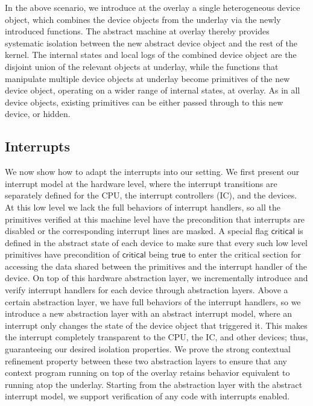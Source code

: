 In the above scenario, we introduce at the overlay a single heterogeneous device
object, which combines the device objects from the underlay via the newly
introduced functions. The abstract machine at overlay thereby provides
systematic isolation between the new abstract device object and the rest of the
kernel. The internal states and local logs of the combined device object are the
disjoint union of the relevant objects at underlay, while the functions that
manipulate multiple device objects at underlay become primitives of the new
device object, operating on a wider range of internal states, at overlay. As in
all device objects, existing primitives can be either passed through to this new
device, or hidden.


\subsection{Interrupts}

We now show how to adapt the interrupts into our setting.  We first present our
interrupt model at the hardware level, where the interrupt transitions are
separately defined for the CPU, the interrupt controllers (IC), and the devices.
At this low level we lack the full behaviors of interrupt handlers, so all the
primitives verified at this machine level have the precondition that interrupts
are disabled or the corresponding interrupt lines are masked. A special flag
$\mathsf{critical}$ is defined in the abstract state of each device to make sure
that every such low level primitives have precondition of $\mathsf{critical}$ 
being $\mathsf{true}$ to enter the critical section for accessing the data
shared between the primitives and the interrupt handler
of the device.  On top of this hardware abstraction layer, we
incrementally introduce and verify interrupt handlers for each device through
abstraction layers.  Above a certain abstraction layer, we have full behaviors
of the interrupt handlers, so we introduce a new abstraction layer with an
abstract interrupt model, where an interrupt only changes the state of the
device object that triggered it.  This makes the interrupt completely
transparent to the CPU, the IC, and other devices; thus, guaranteeing our
desired isolation properties.  We prove the strong contextual refinement
property between these two abstraction layers to ensure that any context program
running on top of the overlay retains behavior equivalent to running atop the
underlay. Starting from the abstraction layer with the abstract interrupt model,
we support verification of any code with interrupts enabled.


